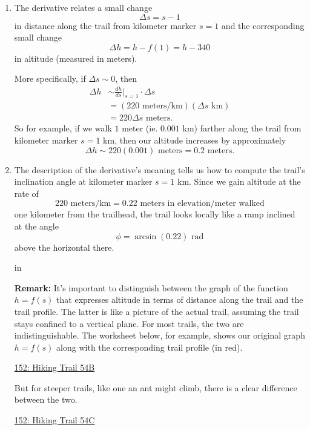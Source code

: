 \documentclass{ximera}
\newcommand{\pskip}{\vskip 0.1 in}
\begin{document}
\begin{question}
\begin{explanation}
\begin{enumerate}
\item The derivative relates a small change
\[
   \Delta s = s - 1
\]
in distance along the trail from kilometer marker $s=1$ and the corresponding small change
\[
    \Delta h = h - f(1) = h - 340
\]
in altitude (measured in meters). 

More specifically, if $\Delta s\sim 0$, then
\begin{align*}
  \Delta h &\sim \frac{dh}{ds}\Big|_{s=1} \cdot \Delta s \\
               &= (220 \text{ meters/km})(\Delta s \text{ km})  \\
                &= 220 \Delta s \text{ meters}.
\end{align*}
So for example, if we walk $1$ meter (ie. $0.001$ km) farther along the trail from kilometer marker $s=1$ km, then our altitude increases by approximately
\[
     \Delta h \sim 220(0.001)\text{ meters} = 0.2 \text{ meters} .
\]

\item The description of the derivative's meaning tells us how to compute the trail's inclination angle at kilometer marker $s=1$ km. Since we gain altitude at the rate of
\[
     220 \text{ meters/km} = 0.22 \text{ meters in elevation/meter walked}   
\]
one kilometer from the trailhead, the trail looks locally like a ramp inclined at the angle
\[
  \phi = \arcsin(0.22) \text{ rad}
\]
above the horizontal there.

\pskip

{\bf Remark:} It's important to distinguish between the graph of the function $h=f(s)$ that expresses altitude in terms of distance along the trail and the trail profile. The latter is like a picture of the actual trail, assuming the trail stays confined to a vertical plane. For most trails, the two are indistinguishable. The worksheet below, for example, shows our original graph $h=f(s)$ along with the corresponding trail profile (in red).

\begin{onlineOnly}
    \begin{center}
\end{center}
\end{onlineOnly}

\href{https://www.desmos.com/calculator/e5kuf1je8p}{152: Hiking Trail 54B}

But for steeper trails, like one an ant might climb, there is a clear difference between the two.

\begin{onlineOnly}
    \begin{center}
\end{center}
\end{onlineOnly}

\href{https://www.desmos.com/calculator/lktn53d7ju}{152: Hiking Trail 54C}



\end{enumerate}
\end{explanation}


\end{question}
\end{document}
